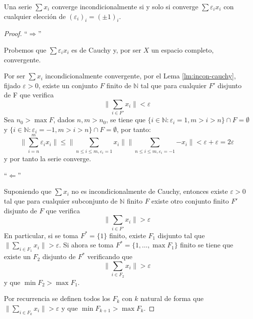 	\begin{lemma} \label{lm:incondicional-epsilon}
		Una serie $\sum{x_i}$ converge incondicionalmente si y solo si converge $\sum{\varepsilon_i x_i}$ con cualquier elección de $(\varepsilon_i )_i= (\pm1)_i$.
	\end{lemma}
	
		\begin{proof}
			\noindent ``$\Longrightarrow$''
			
			
			Probemos que $\sum \varepsilon_ix_i$ es de Cauchy y, por ser $X$ un espacio completo, convergente.
			
			Por ser $\sum x_i$ incondicionalmente convergente, por el Lema \ref{lm:incon-cauchy}, fijado $\varepsilon > 0$, existe un conjunto $F$ finito de $\mathbb{N}$ tal que para cualquier $F'$ disjunto de F que verifica 
			\[ \big\|  \sum_{i \in F'}{x_{i}}  \big\| < \varepsilon \]
			Sea $n_{0} > \max F$, dados $n,m > n_{0}$, se tiene que $\{i \in \mathbb{N} : \varepsilon_{i} = 1, m> i > n \} \cap F = \emptyset$ y $\{ i \in \mathbb{N} : \varepsilon_{i} = -1, m>i>n \}  \cap F = \emptyset$, por tanto:
			$$ \big\|  \sum_{i=n}^{m}{\varepsilon_{i}x_{i}}  \big\| \leq \big\|  \sum_{n \leq i \leq m, \varepsilon_{i}=1}{x_{i}}  \big\|\big\| \sum_{n \leq i \leq m, \varepsilon_{i}=-1}{- x_{i}}  \big\| < \varepsilon + \varepsilon = 2\varepsilon $$
			y por tanto la serie converge.
			
			
			\noindent ``$\Longleftarrow$''
			
			Suponiendo que $\sum{x_{i}}$ no es incondicionalmente de Cauchy, entonces existe $\varepsilon>0$ tal que para cualquier subconjunto de $\mathbb{N}$ finito $F$ existe otro conjunto finito $F'$ disjunto de $F$ que verifica 
			\[\big\|  \sum_{i \in F'}{x_{i}}  \big\| > \varepsilon\]
			En particular, si se toma $F^{*} = \{ 1 \}$ finito, existe $F_{1}$ disjunto tal que $\big\| \displaystyle \sum_{i \in F_{1}}{x_{i}}  \big\| > \varepsilon$.
			Si ahora se toma $F^{*} = \{ 1, \dots, \max F_{1} \}$ finito se tiene que existe un $F_{2}$ disjunto de $F^*$ verificando que 
			\[\big\|  \displaystyle \sum_{i \in F_{2}}{x_{i}}  \big\| > \varepsilon\]
			y que $\min F_{2} > \max F_{1}$.
			
			Por recurrencia se definen todos los $F_{k}$ con $k$ natural de forma que $\big\|  \displaystyle \sum_{i \in F_{k}}{x_{i}}  \big\| > \varepsilon$ y que $\min F_{k+1} > \max F_{k}$.
			

\end{proof}
